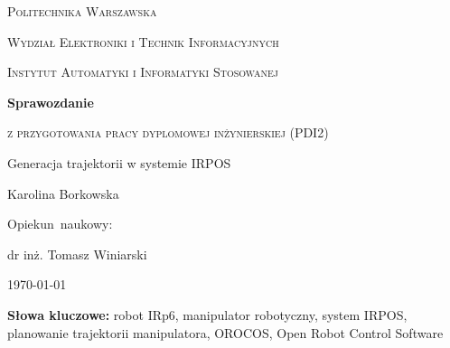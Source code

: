 \documentclass[11pt, a4paper, openright]{report}
\begin{document}
\begin{titlepage}
	\centering
	{\scshape\Large Politechnika Warszawska \par}
	{\scshape\Large Wydział Elektroniki i Technik Informacyjnych \par}
	{\scshape\Large Instytut Automatyki i Informatyki Stosowanej \par}
	\vspace{8cm}
	{\huge\bfseries Sprawozdanie \par}
	\vspace{1cm}
	{\scshape\large z przygotowania pracy dyplomowej inżynierskiej (PDI2) \par}
	\vspace{2cm}
	{\Large Generacja trajektorii w systemie IRPOS \par}
	\vspace{2cm}
	{\Large Karolina Borkowska\par}
	\vfill

	Opiekun~naukowy:\par
	dr inż. Tomasz Winiarski

	\vfill
	{\large \today\par}
\end{titlepage}

	\noindent\begin{minipage}{\linewidth}
		\renewcommand{\abstractname}{Streszczenie}
		\setlength{\parindent}{15pt}

		\begin{abstract}
			\textbf{Tytuł: Generacja trajektorii w systemie IRPOS}\\
			Celem pracy inżynierskiej była modyfikacja systemu IRPOS, umożliwiająca sprawdzenie, czy w~trakcie osiągania przez robota IRp6 punktów zadanej drogi nie zostaną naruszone jego ograniczenia fizyczne i~dynamiczne. A priori przeanalizowana zostaje trajektoria, którą poruszać się ma robot, by osiągnąć zadane położenie.
			Zmodernizowany został komponent OROCOS, odpowiedzialny za odbieranie i~wstępne sprawdzenie zadania robota.
			Dodatkowo nowa funkcjonalność wstrzymuje dalsze przetwarzanie rozkazu i~związany z~nim ruch. Jest to podejście zgodne z~wcześniej zaimplementowaną koncepcją reakcji na zadanie punktu końcowego niemożliwego do osiągnięcia dla danego stawu.

		\end{abstract}
		\textbf{Słowa kluczowe:}
		robot IRp6, manipulator robotyczny, system IRPOS, planowanie trajektorii manipulatora, OROCOS, Open Robot Control Software 


	\end{minipage}
	\vfill
\end{document}
